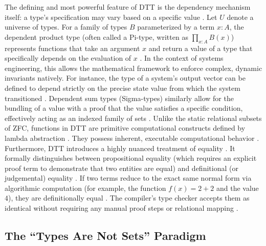 \documentclass[11pt]{article}
\begin{document}
The defining and most powerful feature of DTT is the dependency mechanism itself: a type's specification may vary based on a specific value \parencite{Ref19, Ref29}. Let $U$ denote a universe of types. For a family of types $B$ parameterized by a term $x : A$, the dependent product type (often called a Pi-type, written as $\prod_{x : A} B(x)$) represents functions that take an argument $x$ and return a value of a type that specifically depends on the evaluation of $x$ \parencite{Ref29}. In the context of systems engineering, this allows the mathematical framework to enforce complex, dynamic invariants natively. For instance, the type of a system's output vector can be defined to depend strictly on the precise state value from which the system transitioned \parencite{Ref28}. Dependent sum types (Sigma-types) similarly allow for the bundling of a value with a proof that the value satisfies a specific condition, effectively acting as an indexed family of sets \parencite{Ref19, Ref29}. Unlike the static relational subsets of ZFC, functions in DTT are primitive computational constructs defined by lambda abstraction \parencite{Ref23}. They possess inherent, executable computational behavior \parencite{Ref19}. Furthermore, DTT introduces a highly nuanced treatment of equality \parencite{Ref25}. It formally distinguishes between propositional equality (which requires an explicit proof term to demonstrate that two entities are equal) and definitional (or judgemental) equality \parencite{Ref25}. If two terms reduce to the exact same normal form via algorithmic computation (for example, the function $f(x) = 2 + 2$ and the value $4$), they are definitionally equal \parencite{Ref19}. The compiler's type checker accepts them as identical without requiring any manual proof steps or relational mapping \parencite{Ref19, Ref25}.\subsection{The ``Types Are Not Sets'' Paradigm}
\end{document}
